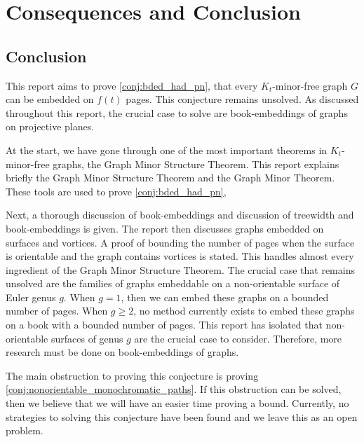 \chapter{Consequences and Conclusion}\label{chap:conclusion}



\section{Conclusion}
This report aims to prove \cref{conj:bded_had_pn}, that every $K_t$-minor-free graph $G$ can be embedded on $f(t)$ pages. This conjecture remains unsolved. 
As discussed throughout this report, the crucial case to solve are book-embeddings of graphs on projective planes. 

At the start, we have gone through one of the most important theorems in $K_t$-minor-free graphs, the Graph Minor Structure Theorem. This report explains briefly the Graph Minor Structure Theorem and the Graph Minor Theorem. 
These tools are used to prove \cref{conj:bded_had_pn},

Next, a thorough discussion of book-embeddings and discussion of treewidth and book-embeddings is given. The report then discusses graphs embedded on surfaces and vortices. A proof of bounding the number of pages when the surface is orientable and the graph contains vortices is stated. This handles almost every ingredient of the Graph Minor Structure Theorem. The crucial case that remains unsolved are the families of graphs embeddable on a non-orientable surface of Euler genus $g$. When $g = 1$, then we can embed these graphs on a bounded number of pages. When $g \geq 2$, no method currently exists to embed these graphs on a book with a bounded number of pages. This report has isolated that non-orientable surfaces of genus $g$ are the crucial case to consider. Therefore, more research must be done on book-embeddings of graphs. 

The main obstruction to proving this conjecture is proving \cref{conj:nonorientable_monochromatic_paths}. If this obstruction can be solved, then we believe that we will have an easier time proving a bound. Currently, no strategies to solving this conjecture have been found and we leave this as an open problem. 
